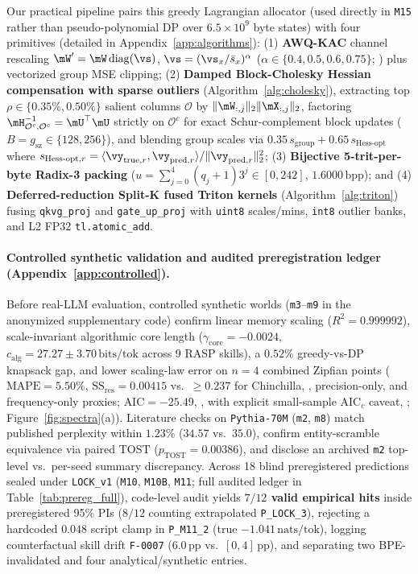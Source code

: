 \documentclass[10pt]{article} %
\newcommand{\bpp}{\mathrm{bpp}}
\begin{document}
Our practical pipeline pairs this greedy Lagrangian allocator (used directly in \texttt{M15} rather than pseudo-polynomial DP over $6.5\times 10^9$ byte states) with four primitives (detailed in Appendix~\ref{app:algorithms}): (1) \textbf{AWQ-KAC} channel rescaling $\mW' = \mW\,\mathrm{diag}(\vs)$, $\vs = (\vs_x / \bar{s}_x)^\alpha$ ($\alpha \in \{0.4, 0.5, 0.6, 0.75\}$; \citealp{lin2024awq}) plus vectorized group MSE clipping; (2) \textbf{Damped Block-Cholesky Hessian compensation with sparse outliers} (Algorithm~\ref{alg:cholesky}), extracting top $\rho \in \{0.35\%, 0.50\%\}$ salient columns $\mathcal{O}$ by $\|\mW_{:,j}\|_2\|\mX_{:,j}\|_2$, factoring $\mH_{\mathcal{O}^c,\mathcal{O}^c}^{-1} = \mU^\top\mU$ strictly on $\mathcal{O}^c$ for exact Schur-complement block updates ($B = g_{\text{sz}} \in \{128, 256\}$), and blending group scales via $0.35\,s_{\text{group}} + 0.65\,s_{\text{Hess-opt}}$ where $s_{\text{Hess-opt},r} = \langle \vy_{\text{true},r}, \vy_{\text{pred},r}\rangle / \|\vy_{\text{pred},r}\|_2^2$; (3) \textbf{Bijective 5-trit-per-byte Radix-3 packing} ($u = \sum_{j=0}^{4}(q_j+1)3^j \in [0,242]$, $1.6000\,\bpp$); and (4) \textbf{Deferred-reduction Split-K fused Triton kernels} (Algorithm~\ref{alg:triton}) fusing \texttt{qkvg\_proj} and \texttt{gate\_up\_proj} with \texttt{uint8} scales/mins, \texttt{int8} outlier banks, and L2 FP32 \texttt{tl.atomic\_add}.

\paragraph{Controlled synthetic validation and audited preregistration ledger (Appendix~\ref{app:controlled}).}
Before real-LLM evaluation, controlled synthetic worlds (\texttt{m3}--\texttt{m9} in the anonymized supplementary code) confirm linear memory scaling ($R^2 = 0.999992$), scale-invariant algorithmic core length ($\gamma_{\text{core}} = -0.0024$, $c_{\text{alg}} = 27.27 \pm 3.70\,\text{bits/tok}$ across 9 RASP skills), a $0.52\%$ greedy-vs-DP knapsack gap, and lower scaling-law error on $n=4$ combined Zipfian points ($\text{MAPE}=5.50\%$, $\text{SS}_{\text{res}} = 0.00415$ vs.\ $\ge 0.237$ for Chinchilla, \citealp{hoffmann2022chinchilla}, precision-only, and frequency-only proxies; $\text{AIC}=-25.49$, \citealp{akaike1974aic}, with explicit small-sample $\mathrm{AIC}_c$ caveat, \citealp{burnham2002aic}; Figure~\ref{fig:spectra}(a)). Literature checks on \texttt{Pythia-70M} (\texttt{m2}, \texttt{m8}) match published perplexity within $1.23\%$ ($34.57$ vs.\ $35.0$), confirm entity-scramble equivalence via paired TOST \citep{lakens2017tost} ($p_{\text{TOST}}=0.00386$), and disclose an archived \texttt{m2} top-level vs.\ per-seed summary discrepancy. Across 18 blind preregistered predictions sealed under \texttt{LOCK\_v1} (\texttt{M10}, \texttt{M10B}, \texttt{M11}; full audited ledger in Table~\ref{tab:prereg_full}), code-level audit yields \textbf{$7/12$ valid empirical hits} inside preregistered 95\% PIs ($8/12$ counting extrapolated \texttt{P\_LOCK\_3}), rejecting a hardcoded $0.048$ script clamp in \texttt{P\_M11\_2} (true $-1.041\,\text{nats/tok}$), logging counterfactual skill drift \texttt{F-0007} ($6.0\,\text{pp}$ vs.\ $[0,4]\,\text{pp}$), and separating two BPE-invalidated and four analytical/synthetic entries.
\end{document}
